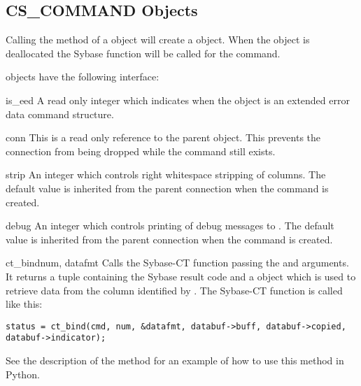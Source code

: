 \subsection{CS_COMMAND Objects}

Calling the  method of a 
object will create a  object.  When the
 object is deallocated the Sybase
 function will be called for the command.

 objects have the following interface:

\begin{memberdesc}[CS_COMMAND]{is_eed}
A read only integer which indicates when the  object
is an extended error data command structure.
\end{memberdesc}

\begin{memberdesc}[CS_COMMAND]{conn}
This is a read only reference to the parent 
object.  This prevents the connection from being dropped while the
command still exists.
\end{memberdesc}

\begin{memberdesc}[CS_COMMAND]{strip}
An integer which controls right whitespace stripping of 
columns.  The default value is inherited from the parent connection
when the command is created.
\end{memberdesc}

\begin{memberdesc}[CS_COMMAND]{debug}
An integer which controls printing of debug messages to .
The default value is inherited from the parent connection when the
command is created.
\end{memberdesc}

\begin{methoddesc}[CS_COMMAND]{ct_bind}{num, datafmt}
Calls the Sybase-CT  function passing the 
and  arguments.  It returns a tuple containing the Sybase
result code and a  object which is used to retrieve
data from the column identified by .  The Sybase-CT
 function is called like this:

\begin{verbatim}
status = ct_bind(cmd, num, &datafmt, databuf->buff, databuf->copied, databuf->indicator);
\end{verbatim}

See the description of the  method for an
example of how to use this method in Python.
\end{methoddesc}

